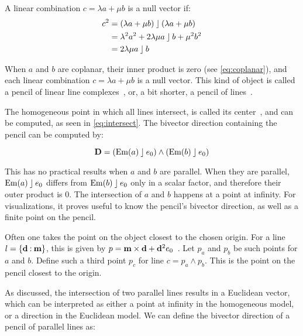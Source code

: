 


A linear combination $c = \lambda a + \mu b$ is a null vector if:
\begin{align}
  \label{eq:lincombnull}
  c^2 &= (\lambda a + \mu b) \mathbin{\rfloor} (\lambda a + \mu b) \nonumber \\
  &= \lambda^2 a^2 + 2 \lambda \mu a \mathbin{\rfloor} b + \mu^2 b^2 \nonumber \\
  &= 2 \lambda \mu a \mathbin{\rfloor} b
\end{align}

When $a$ and $b$ are coplanar, their inner product is zero (see \autoref{eq:coplanar}), and each linear combination $c = \lambda a + \mu b$ is a null vector.  This kind of object is called a pencil of linear line complexes~\cite[Section 3.2.1]{Pottmann}, or, a bit shorter, a pencil of lines~\cite{Hongbo}.

The homogeneous point in which all lines intersect, is called its center~\cite{Hongbo}, and can be computed, as seen in \autoref{eq:intersect}.  The bivector direction containing the pencil can be computed by:

\begin{equation*}
  \mathbf{D} = \left(\operatorname{Em}(a) \mathbin{\rfloor} e_0 \right) \wedge \left(\operatorname{Em}(b) \mathbin{\rfloor} e_0\right)
\end{equation*}

This has no practical results when $a$ and $b$ are parallel.  When they are parallel, $\operatorname{Em}(a) \mathbin{\rfloor} e_0$ differs from $\operatorname{Em}(b) \mathbin{\rfloor} e_0$ only in a scalar factor, and therefore their outer product is $0$.  The intersection of $a$ and $b$ happens at a point at infinity.  For visualizations, it proves useful to know the pencil's bivector direction, as well as a finite point on the pencil.  

Often one takes the point on the object closest to the chosen origin.  For a line $l = \{\mathbf{d} \mathbin{:} \mathbf{m}\}$, this is given by $p = \mathbf{m} \times \mathbf{d} + \mathbf{d}^2 e_0$~\cite{Shoemake}.  Let $p_a$ and $p_b$ be such points for $a$ and $b$.  Define such a third point $p_c$ for line $c = p_a \wedge p_b$.  This is the point on the pencil closest to the origin.  

As discussed, the intersection of two parallel lines results in a Euclidean vector, which can be interpreted as either a point at infinity in the homogeneous model, or a direction in the Euclidean model.  We can define the bivector direction of a pencil of parallel lines as:

